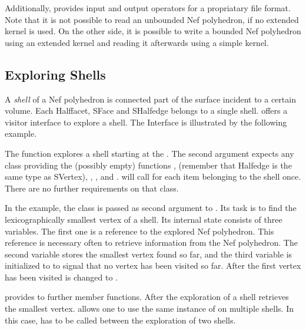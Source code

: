 Additionally,  provides input and output operators for
a propriatary file format. Note that it is not possible to read an unbounded
Nef polyhedron, if no extended kernel is used. On the other side, it is
possible to write a bounded Nef polyhedron using an extended kernel and 
reading it afterwards using a simple kernel.


\subsection{Exploring Shells}

A \emph{shell} of a Nef polyhedron is connected part of the surface incident
to a certain volume. Each Halffacet, SFace and SHalfedge belongs to a single
shell.  offers a visitor interface to explore a shell.
The Interface is illustrated by the following example.


The function  
explores a shell starting at the . The second argument expects any
class providing the (possibly empty) functions ,
 (remember that Halfedge is the same type as
SVertex), 
, , 
 and . 
 will call  for each item belonging
to the shell once. There are no further requirements on that class. 

In the example, the class  is passed as second argument
to . Its task is to find the lexicographically
smallest vertex of a shell. Its internal state consists of three variables. 
The first one is a reference to the explored Nef polyhedron. This reference
is necessary often to retrieve information from the Nef polyhedron. The
second variable  stores the smallest vertex found so far, and
the third variable  is initialized to  to signal that no
vertex has been visited so far. After the first vertex has been visited 
 is changed to .

 provides to further member functions. After the exploration
of a shell  retrieves the smallest vertex. 
 allows one to use the same instance of 
 on multiple shells. In this case, 
has to be called between the exploration of two shells.

